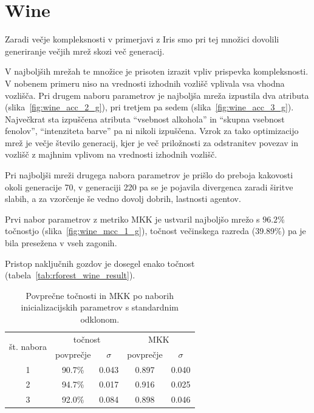 \documentclass[a4paper,12pt,openright]{book}
\begin{document}
    \section{Wine}\label{sec:rezultati-wine}
    Zaradi večje kompleksnosti v primerjavi z Iris smo pri tej množici dovolili generiranje večjih mrež skozi več generacij.

    V najboljših mrežah te množice je prisoten izrazit vpliv prispevka kompleksnosti.
    V nobenem primeru niso na vrednosti izhodnih vozlišč vplivala vsa vhodna vozlišča.
    Pri drugem naboru parametrov je najboljša mreža izpustila dva atributa (slika~\ref{fig:wine_acc_2_g}), pri tretjem pa sedem (slika~\ref{fig:wine_acc_3_g}).
    Največkrat sta izpuščena atributa \enquote{vsebnost alkohola} in \enquote{skupna vsebnost fenolov},
    \enquote{intenziteta barve} pa ni nikoli izpuščena.
    Vzrok za tako optimizacijo mrež je večje število generacij, kjer je več priložnosti za odstranitev povezav in vozlišč z majhnim
    vplivom na vrednosti izhodnih vozlišč.

    Pri najboljši mreži drugega nabora parametrov je prišlo do preboja kakovosti okoli generacije 70, v generaciji 220
    pa se je pojavila divergenca zaradi širitve slabih, a za vzorčenje še vedno dovolj dobrih, lastnosti agentov.

    Prvi nabor parametrov z metriko MKK je ustvaril najboljšo mrežo s $96.2\%$ točnostjo (slika~\ref{fig:wine_mcc_1_g}),
    točnost večinskega razreda (39.89\%) pa je bila presežena v vseh zagonih.

    Pristop naključnih gozdov je dosegel enako točnost (tabela~\ref{tab:rforest_wine_result}).

    \begin{table}[H]
        \begin{center}
            \begin{tabular}{|| c | c c || c c ||}
                \hline
                \multirow{2}{*}{št. nabora} & \multicolumn{2}{c||}{točnost} & \multicolumn{2}{c||}{MKK} \\ \cline{2-5}
                & povprečje & $\sigma$ & povprečje & $\sigma$ \\
                \hline
                1 & 90.7\%    & 0.043   & 0.897     & 0.040    \\
                2 & 94.7\%    & 0.017   & 0.916     & 0.025    \\
                3 & 92.0\%    & 0.084   & 0.898     & 0.046    \\
                \hline
            \end{tabular}
        \end{center}
        \caption{Povprečne točnosti in MKK po naborih inicializacijskih parametrov s standardnim odklonom.}
        \label{tab:wine_result_aggregate}
    \end{table}
\end{document}

